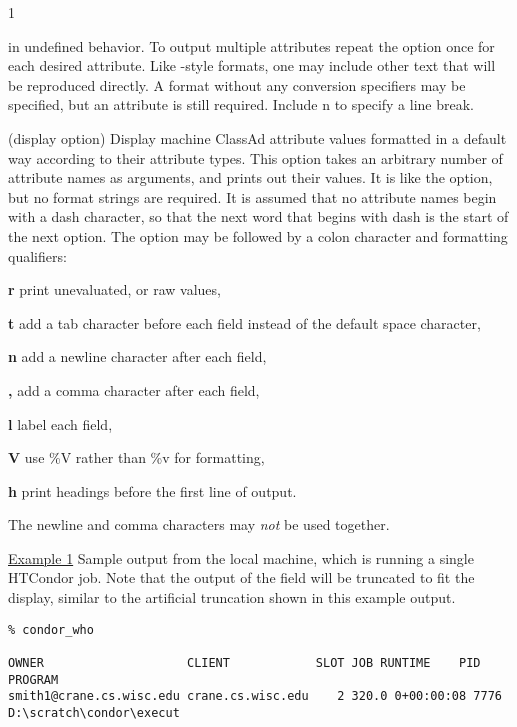 \begin{ManPage}{\label{man-condor-who}}{1}
\begin{Options}
{      in undefined behavior.  To output multiple attributes
      repeat the  option once for each desired
      attribute.
      Like -style formats, one may include other
      text that will be reproduced directly.
      A format without any conversion specifiers may be specified,
      but an attribute is still required.
      Include \Bs n to specify a line break. }
     {
      (display option) Display machine ClassAd attribute values 
      formatted in a default way according to their attribute types.  
      This option takes an arbitrary number of attribute names as arguments,
      and prints out their values.  It is like the  option,
      but no format strings are required.
      It is assumed that no attribute names begin with a dash character,
      so that the next word that begins with dash is the 
      start of the next option.
      The  option may be followed by a colon character
      and formatting qualifiers:

      \textbf{r} print unevaluated, or raw values,

      \textbf{t} add a tab character before each field instead of 
      the default space character,

      \textbf{n} add a newline character after each field,

      \textbf{,} add a comma character after each field,

      \textbf{l} label each field,

      \textbf{V} use \%V rather than \%v for formatting,

      \textbf{h} print headings before the first line of output.

      The newline and comma characters may \emph{not} be used together.
      }
\end{Options}

\Examples

\underline{Example 1} Sample output from the local machine,
which is running a single HTCondor job.
Note that the output of the  field will be truncated
to fit the display, similar to the artificial truncation shown in this 
example output.
\footnotesize
\begin{verbatim}
% condor_who 

OWNER                    CLIENT            SLOT JOB RUNTIME    PID    PROGRAM
smith1@crane.cs.wisc.edu crane.cs.wisc.edu    2 320.0 0+00:00:08 7776 D:\scratch\condor\execut
\end{verbatim}
\normalsize


\end{ManPage}
